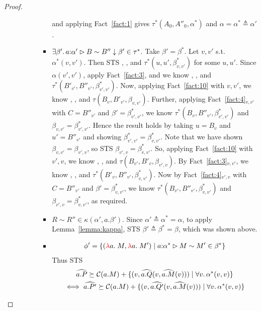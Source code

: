 \begin{proof}
\begin{enumerate}
\begin{itemize}
\begin{enumerate}
\begin{itemize}
          and applying Fact~\ref{fact:1} gives $\tau^*(A_0,A''_0,\alpha^*)$ and $\alpha = \alpha^* \triangleq \alpha'$. 
        \item $\exists \beta'.\, \sameTypeOne{a}{\alpha'}{B}{B''}{\beta'}{\tau^*}$. Take $\beta' = \beta^*$. Let $v,v'$ s.t. $\alpha^*(v,v')$. Then STS
          , , and $\tau^*(u,u',\beta^*_{v,v'})$ for some $u,u'$. 
          Since $\alpha(v',v')$, apply Fact~\ref{fact:3}, and we know 
          , , and
          $\tau^*(B'_{v'},B''_{v'},\beta^*_{v',v'})$.
          Now, applying Fact~\ref{fact:10} with $v,v'$, we know
          , , and $\tau(B_v,B'_{v'},\beta_{v,v'})$. 
          Further, applying Fact~\ref{fact:4}$_{v,v'}$ with
          $C = B''_{v'}$ and $\beta' = \beta^*_{v',v'}$, 
          we know $\tau^*(B_v,B''_{v'},\beta^*_{v',v'})$ and $\beta_{v,v'} = \beta^*_{v',v'}$.
          Hence the result holds by taking $u = B_v$ and $u' = B''_{v'}$ and showing
          $\beta^*_{v',v'} = \beta^*_{v,v'}$. Note that we have shown $\beta_{v,v'} = \beta_{v',v}$, 
          so STS $\beta_{v',v} = \beta^*_{v,v'}$. 
          So, applying Fact~\ref{fact:10} with $v',v$, we know
          , , and $\tau(B_{v'},B'_{v},\beta_{v',v})$. 
          By Fact~\ref{fact:3}$_{v,v'}$, we know 
          , , and $\tau^*(B'_{v},B''_{v'},\beta^*_{v,v'})$. 
          Now by Fact~\ref{fact:4}$_{v',v}$ with $C =  B''_{v'}$ and $\beta' = \beta^*_{v,v'}$, 
          we know $\tau^*(B_{v'}, B''_{v'}, \beta^*_{v,v'})$ and $\beta_{v',v} = \beta^*_{v,v'}$, as required.
        \item $R \sim R'' \in \kappa(\alpha',a.\beta')$. Since $\alpha' \triangleq \alpha^* = \alpha$, 
          to apply Lemma~\ref{lemma:kappa}, STS $\beta' \triangleq \beta^* = \beta$, which was shown above.
        \item \begin{gather*}
      \phi' = \{(\lam{a}{\_}{M}, \lam{a}{}{M'}) \mid 
          \sameComp{\isOf{a}{\alpha^*}}{M}{M'}{\beta^*}\}\\
      \end{gather*}
          Thus STS
          \begin{gather*}
            \widehat{a.P} \succeq \cost{a.M} + \{(v, \widehat{a.Q}(v,\widehat{a.M}(v))) \mid \forall v.\, \alpha^*(v,v)\}\\
          \iff \widehat{a.P'} \succeq \cost{a.M} + \{(v, \widehat{a.Q'}(v,\widehat{a.M}(v))) \mid \forall v.\, \alpha^*(v,v)\} 

\end{gather*}
\end{itemize}
\end{enumerate}
\end{itemize}
\end{enumerate}
\end{proof}
